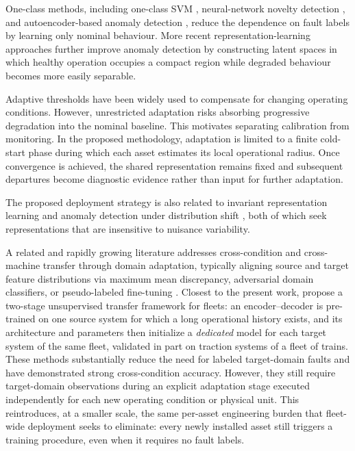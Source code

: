 \documentclass{trbunofficial}
\begin{document}
One-class methods, including one-class SVM \citep{scholkopf1999},
neural-network novelty detection \citep{bishop1994}, and autoencoder-based
anomaly detection \citep{hinton2006,sakurada2014}, reduce the dependence on
fault labels by learning only nominal behaviour. More recent
representation-learning approaches further improve anomaly detection by
constructing latent spaces in which healthy operation occupies a compact
region while degraded behaviour becomes more easily separable.

Adaptive thresholds have been widely used to compensate for changing
operating conditions. However, unrestricted adaptation risks absorbing
progressive degradation into the nominal baseline. This motivates separating
calibration from monitoring. In the proposed methodology, adaptation is
limited to a finite cold-start phase during which each asset estimates its
local operational radius. Once convergence is achieved, the shared
representation remains fixed and subsequent departures become diagnostic
evidence rather than input for further adaptation.

The proposed deployment strategy is also related to invariant
representation learning \citep{bronstein2021} and anomaly detection under
distribution shift \citep{li2023invariant}, both of which seek
representations that are insensitive to nuisance variability.

A related and rapidly growing literature addresses cross-condition and
cross-machine transfer through domain adaptation, typically aligning source
and target feature distributions via maximum mean discrepancy, adversarial
domain classifiers, or pseudo-labeled fine-tuning
\citep{nguyen2025subdomain,ning2026digitaltwin}. Closest to the present work,
\citet{wang2026fleet} propose a two-stage unsupervised transfer framework for
fleets: an encoder--decoder is pre-trained on one source system for which a
long operational history exists, and its architecture and parameters then
initialize a \emph{dedicated} model for each target system of the same fleet,
validated in part on traction systems of a fleet of trains. These methods
substantially reduce the need for labeled target-domain faults and have
demonstrated strong cross-condition accuracy. However, they still require
target-domain observations during an explicit adaptation stage executed
independently for each new operating condition or physical unit. This
reintroduces, at a smaller scale, the same per-asset engineering burden that
fleet-wide deployment seeks to eliminate: every newly installed asset still
triggers a training procedure, even when it requires no fault labels.
\end{document}
